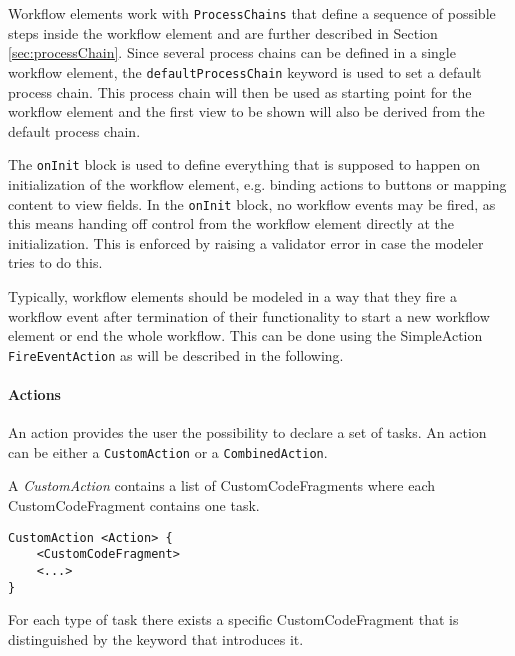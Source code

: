 Workflow elements work with \lstinline!ProcessChains! that define a sequence of possible steps inside the workflow element and are further described in Section \ref{sec:processChain}. Since several process chains can be defined in a single workflow element, the \lstinline!defaultProcessChain! keyword is used to set a default process chain. This process chain will then be used as starting point for the workflow element and the first view to be shown will also be derived from the default process chain.

The \lstinline!onInit! block is used to define everything that is supposed to happen on initialization of the workflow element, e.g. binding actions to buttons or mapping content to view fields. In the \lstinline!onInit! block, no workflow events may be fired, as this means handing off control from the workflow element directly at the initialization. This is enforced by raising a validator error in case the modeler tries to do this.

Typically, workflow elements should be modeled in a way that they fire a workflow event after termination of their functionality to start a new workflow element or end the whole workflow. This can be done using the SimpleAction \lstinline!FireEventAction! as will be described in the following.

\paragraph{Actions}
An action provides the user the possibility to declare a set of tasks. An action can be either a \lstinline!CustomAction! or a \lstinline!CombinedAction!.

A \textit{CustomAction} contains a list of CustomCodeFragments where each CustomCodeFragment contains one task.

\begin{lstlisting}
CustomAction <Action> {
	<CustomCodeFragment>
	<...>
}
\end{lstlisting}

For each type of task there exists a specific CustomCodeFragment that is distinguished by the keyword that introduces it.

